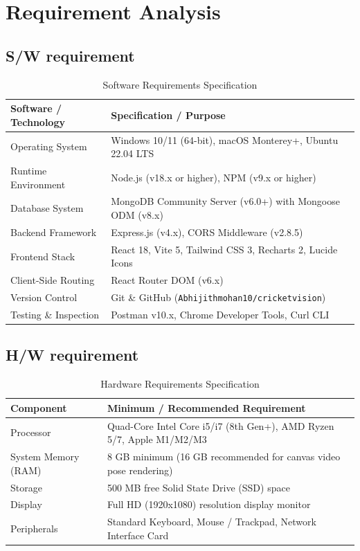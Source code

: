 \documentclass[12pt,a4paper]{report}
\begin{document}
\section{Requirement Analysis}

\subsection{S/W requirement}
\begin{table}[H]
\centering
\caption{Software Requirements Specification}
\label{tab:software_reqs}
\begin{tabular}{ll}
\toprule
\textbf{Software / Technology} & \textbf{Specification / Purpose} \\
\midrule
Operating System & Windows 10/11 (64-bit), macOS Monterey+, Ubuntu 22.04 LTS \\
Runtime Environment & Node.js (v18.x or higher), NPM (v9.x or higher) \\
Database System & MongoDB Community Server (v6.0+) with Mongoose ODM (v8.x) \\
Backend Framework & Express.js (v4.x), CORS Middleware (v2.8.5) \\
Frontend Stack & React 18, Vite 5, Tailwind CSS 3, Recharts 2, Lucide Icons \\
Client-Side Routing & React Router DOM (v6.x) \\
Version Control & Git \& GitHub (\texttt{Abhijithmohan10/cricketvision}) \\
Testing \& Inspection & Postman v10.x, Chrome Developer Tools, Curl CLI \\
\bottomrule
\end{tabular}
\end{table}

\subsection{H/W requirement}
\begin{table}[H]
\centering
\caption{Hardware Requirements Specification}
\label{tab:hardware_reqs}
\begin{tabular}{ll}
\toprule
\textbf{Component} & \textbf{Minimum / Recommended Requirement} \\
\midrule
Processor & Quad-Core Intel Core i5/i7 (8th Gen+), AMD Ryzen 5/7, Apple M1/M2/M3 \\
System Memory (RAM) & 8 GB minimum (16 GB recommended for canvas video pose rendering) \\
Storage & 500 MB free Solid State Drive (SSD) space \\
Display & Full HD (1920x1080) resolution display monitor \\
Peripherals & Standard Keyboard, Mouse / Trackpad, Network Interface Card \\
\bottomrule
\end{tabular}
\end{table}
\end{document}
